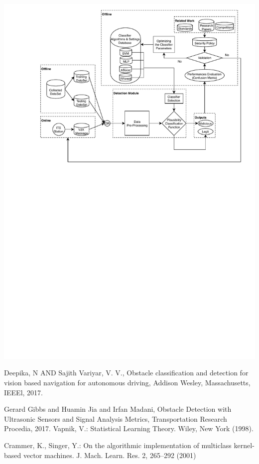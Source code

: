 \documentclass[a4paper]{report}
\begin{document}
\begin{center}
   \includegraphics[width=\textwidth]{MLFramework.pdf}
\end{center}


\begin{thebibliography}{9}
          Deepika, N AND Sajith Variyar, V. V.,
          Obstacle classification and detection for vision based navigation for autonomous driving,
          Addison Wesley, Massachusetts,
          IEEEl,
          2017.
     
         
          Gerard Gibbs and Huamin Jia and Irfan Madani,
          Obstacle Detection with Ultrasonic Sensors and Signal Analysis Metrics,
          Transportation Research Procedia,
          2017.
		Vapnik, V.: Statistical Learning Theory. Wiley, New York (1998).

Crammer, K., Singer, Y.: On the algorithmic implementation of multiclass kernel-based vector machines. J. Mach. Learn. Res. 2, 265–292 (2001)
\end{thebibliography}
\end{document}
